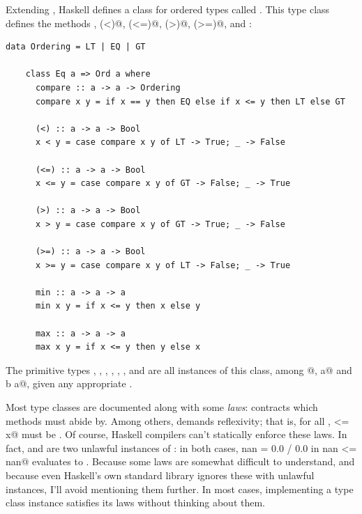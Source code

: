 \documentclass[UdineBachThesis,american,11pt]{PhdThesis}
\begin{document}
  Extending \lstinline@Eq@, Haskell defines a class for ordered types called
  \lstinline@Ord@. This type class defines the methods \lstinline@compare@,
  \lstinline@(<)@, \lstinline@(<=)@, \lstinline@(>)@, \lstinline@(>=)@,
  \lstinline@min@ and \lstinline@max@:

  \begin{lstlisting}[gobble=4,basicstyle=\ttfamily\small]
    data Ordering = LT | EQ | GT

    class Eq a => Ord a where
      compare :: a -> a -> Ordering
      compare x y = if x == y then EQ else if x <= y then LT else GT

      (<) :: a -> a -> Bool
      x < y = case compare x y of LT -> True; _ -> False

      (<=) :: a -> a -> Bool
      x <= y = case compare x y of GT -> False; _ -> True

      (>) :: a -> a -> Bool
      x > y = case compare x y of GT -> True; _ -> False

      (>=) :: a -> a -> Bool
      x >= y = case compare x y of LT -> False; _ -> True

      min :: a -> a -> a
      min x y = if x <= y then x else y

      max :: a -> a -> a
      max x y = if x <= y then y else x
  \end{lstlisting}

  The primitive types \lstinline@Int@, \lstinline@Word@, \lstinline@Integer@,
  \lstinline@Float@, \lstinline@Double@, \lstinline@Rational@, \lstinline@Bool@
  and \lstinline@Char@ are all instances of this class, among \lstinline@[a]@,
  \lstinline@Maybe a@ and \lstinline@Either b a@, given any appropriate
  \lstinline@a@.

  Most type classes are documented along with some \emph{laws}: contracts which
  methods must abide by. Among others, \lstinline@Ord@ demands reflexivity; that
  is, for all \lstinline@x@, \lstinline@x <= x@ must be \lstinline@True@. Of
  course, Haskell compilers can't statically enforce these laws. In fact,
  \lstinline@Float@ and \lstinline@Double@ are two unlawful instances of
  \lstinline@Ord@: in both cases, \lstinline@let nan = 0.0 / 0.0 in nan <= nan@
  evaluates to \lstinline@False@. Because some laws are somewhat difficult to
  understand, and because even Haskell's own standard library ignores these with
  unlawful instances, I'll avoid mentioning them further. In most cases,
  implementing a type class instance satisfies its laws without thinking about
  them.
\end{document}
